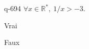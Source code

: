 \begin{truefalse}{q-694}
$\forall x \in \mathbb R^*,\: 1/x>-3$.
\item Vrai
\item* Faux
\end{truefalse}

